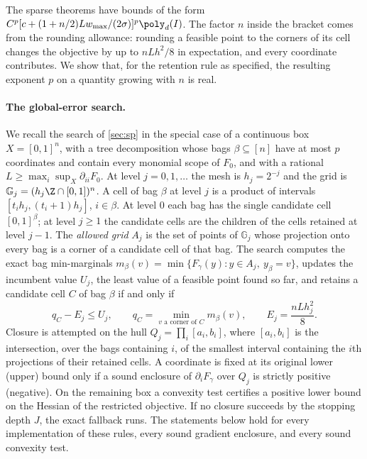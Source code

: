 The sparse theorems have bounds of the form
$C^p[c+(1+n/2)Lw_{\max}/(2\sigma)]^p\poly_d(I)$. The factor $n$ inside the
bracket comes from the rounding allowance: rounding a feasible point to the
corners of its cell changes the objective by up to $nLh^2/8$ in expectation,
and every coordinate contributes. We show that, for the retention rule as
specified, the resulting exponent $p$ on a quantity growing with $n$ is
real.

\paragraph{The global-error search.}
We recall the search of \cref{sec:sp} in the special case of a continuous
box $X=[0,1]^n$, with a tree decomposition whose bags $\beta\subseteq[n]$
have at most $p$ coordinates and contain every monomial scope of $F_0$, and
with a rational $L\ge\max_i\sup_X\partial_{ii}F_0$. At level $j=0,1,\ldots$
the mesh is $h_j=2^{-j}$ and the grid is
$\mathbb G_j=(h_j\Z\cap[0,1])^n$. A cell of bag $\beta$ at level $j$ is a
product of intervals $[t_ih_j,(t_i+1)h_j]$, $i\in\beta$. At level $0$ each
bag has the single candidate cell $[0,1]^\beta$; at level $j\ge1$ the
candidate cells are the children of the cells retained at level $j-1$. The
\emph{allowed grid} $A_j$ is the set of points of $\mathbb G_j$ whose
projection onto every bag is a corner of a candidate cell of that bag. The
search computes the exact bag min-marginals
$m_\beta(v)=\min\{F_\gamma(y):y\in A_j,\ y_\beta=v\}$, updates the
incumbent value $U_j$, the least value of a feasible point found so far,
and retains a candidate cell $C$ of bag $\beta$ if and only if
\begin{equation}\label{eq:lim:retain}
 q_C-E_j\le U_j,\qquad
 q_C=\min_{v\text{ a corner of }C}m_\beta(v),\qquad
 E_j=\frac{nLh_j^2}8 .
\end{equation}
Closure is attempted on the hull $Q_j=\prod_i[a_i,b_i]$, where $[a_i,b_i]$
is the intersection, over the bags containing $i$, of the smallest interval
containing the $i$th projections of their retained cells. A coordinate is
fixed at its original lower (upper) bound only if a sound enclosure of
$\partial_iF_\gamma$ over $Q_j$ is strictly positive (negative). On the
remaining box a convexity test certifies a positive lower bound on the
Hessian of the restricted objective. If no closure succeeds by the stopping
depth $J$, the exact fallback runs. The statements below hold for every
implementation of these rules, every sound gradient enclosure, and every
sound convexity test.

